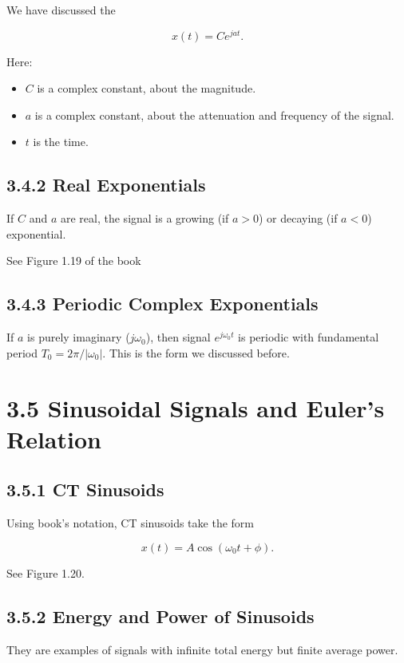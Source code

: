 \documentclass[11pt]{article}
\begin{document}
We have discussed the

\[x(t) = C e^{jat}.\]

Here:

\begin{itemize}
  \item $C$ is a complex constant, about the magnitude.
  \item $a$ is a complex constant, about the attenuation and frequency of the signal.
  \item $t$ is the time.
\end{itemize}

\subsection*{3.4.2 Real Exponentials}

If $C$ and $a$ are real, the signal is a growing (if $a > 0$) or decaying (if $a < 0$) exponential.

See Figure 1.19 of the book

\subsection*{3.4.3 Periodic Complex Exponentials}

If $a$ is purely imaginary ($j\omega_0$), then signal $e^{j\omega_0 t}$ is periodic with fundamental period $T_0 = 2\pi/|\omega_0|$. This is the form we discussed before.

\section*{3.5 Sinusoidal Signals and Euler's Relation}

\subsection*{3.5.1 CT Sinusoids}

Using book's notation, CT sinusoids take the form

\[x(t) = A\cos(\omega_0 t + \phi).\]

See Figure 1.20.

\subsection*{3.5.2 Energy and Power of Sinusoids}

They are examples of signals with infinite total energy but finite average power.
\end{document}
